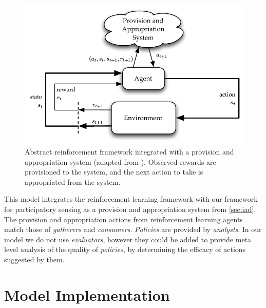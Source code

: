 \begin{figure}
\centering
\includegraphics{gfx/reinforcementlearning}
\caption{Abstract reinforcement framework integrated with a provision and appropriation system (adapted from \citet{Sutton1998}). Observed rewards are provisioned to the system, and the next action to take is appropriated from the system.}\label{fig:reinflearn}
\end{figure}

This model integrates the reinforcement learning framework with our framework
for participatory sensing as a provision and appropriation system from
\autoref{sec:iad}. The provision and appropriation actions from reinforcement
learning agents match those of \emph{gatherers} and \emph{consumers}.
\emph{Policies} are provided by \emph{analysts}. In our model we do not use
\emph{evaluators}, however they could be added to provide meta level analysis
of the quality of \emph{policies}, by determining the efficacy of actions
suggested by them.



\section{Model Implementation}

